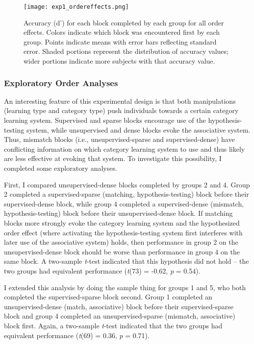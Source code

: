 \documentclass[../dissertation.tex]{subfiles}
\begin{document}
\begin{figure}
\vspace{-10pt}
\texttt{[image: exp1\_ordereffects.png]}
\caption[Accuracy plot for all order effects]{Accuracy (d') for each block completed by each group for all order effects. Colors indicate which block was encountered first by each group. Points indicate means with error bars reflecting standard error. Shaded portions represent the distribution of accuracy values; wider portions indicate more subjects with that accuracy value.}
\label{oes}
\vspace{-10pt}
\end{figure}	
	
\subsubsection{Exploratory Order Analyses}
An interesting feature of this experimental design is that both manipulations (learning type and category type) push individuals towards a certain category learning system. Supervised and sparse blocks encourage use of the hypothesis-testing system, while unsupervised and dense blocks evoke the associative system. Thus, mismatch blocks (i.e., unsupervised-sparse and supervised-dense) have conflicting information on which category learning system to use and thus likely are less effective at evoking that system. To investigate this possibility, I completed some exploratory analyses.\par
	First, I compared unsupervised-dense blocks completed by groups 2 and 4. Group 2 completed a supervised-sparse (matching, hypothesis-testing) block before their supervised-dense block, while group 4 completed a supervised-dense (mismatch, hypothesis-testing) block before their unsupervised-dense block. If matching blocks more strongly evoke the category learning system and the hypothesized order effect (where activating the hypothesis-testing system first interferes with later use of the associative system) holds, then performance in group 2 on the unsupervised-dense block should be worse than performance in group 4 on the same block. A two-sample \textit{t}-test indicated that this hypothesis did not hold -- the two groups had equivalent performance (\textit{t}(73) = -0.62, \textit{p} = 0.54).\par
	I extended this analysis by doing the sample thing for groups 1 and 5, who both completed the supervised-sparse block second. Group 1 completed an unsupervised-dense (match, associative) block before their supervised-sparse block and group 4 completed an unsupervised-sparse (mismatch, associative) block first. Again, a two-sample \textit{t}-test indicated that the two groups had equivalent performance (\textit{t}(69) = 0.36, \textit{p} = 0.71). \par
\end{document}
